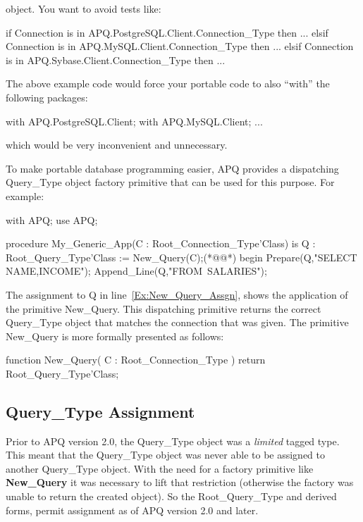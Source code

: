 \documentclass[english,letterpaper]{book}
\begin{document}
object. You want to avoid tests like:

\begin{Example}

if Connection is in APQ.PostgreSQL.Client.Connection_Type then
   ...
elsif Connection is in APQ.MySQL.Client.Connection_Type then
   ...
elsif Connection is in APQ.Sybase.Client.Connection_Type then
   ...

\end{Example}

The above example code would force your portable code to also ``with''
the following packages:

\begin{Example}
with APQ.PostgreSQL.Client;
with APQ.MySQL.Client;
...
\end{Example}

which would be very inconvenient and unnecessary.

To make portable database programming easier, APQ provides a dispatching
Query\_Type object factory primitive that can be used for this purpose.
For example:

\begin{NumberedExample}
with APQ;
use APQ;

procedure My_Generic_App(C : Root_Connection_Type'Class) is
   Q : Root_Query_Type'Class := New_Query(C);(*@\label{Ex:New_Query_Assgn}@*)
begin
   Prepare(Q,"SELECT NAME,INCOME");
   Append_Line(Q,"FROM~SALARIES");
\end{NumberedExample}

The assignment to Q in line~\ref{Ex:New_Query_Assgn}, shows the
application of the primitive New\_Query. This dispatching
primitive returns the correct Query\_Type object that matches the
connection that was given. The primitive New\_Query is more formally
presented as follows:

\begin{Code}
function New_Query(
   C : Root_Connection_Type
) return Root_Query_Type'Class;
\end{Code}

\subsection{Query\_Type Assignment\label{Query_Type Cloning}}

Prior to APQ version 2.0, the Query\_Type object was a \emph{limited}
tagged type. This meant that the Query\_Type object was never able
to be assigned to another Query\_Type object. With the need for a
factory primitive like \textbf{New\_Query} it was necessary to lift
that restriction (otherwise the factory was unable to return the created
object). So the Root\_Query\_Type and derived forms, permit assignment
as of APQ version 2.0 and later.
\end{document}
